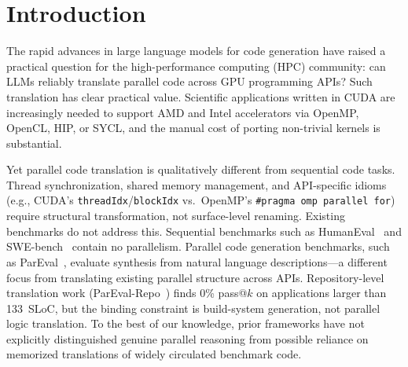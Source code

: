 \documentclass{article}
\begin{document}
\section{Introduction}
\label{sec:introduction}

The rapid advances in large language models for code generation have raised a practical question for the high-performance computing (HPC) community: can LLMs reliably translate parallel code across GPU programming APIs? Such translation has clear practical value. Scientific applications written in CUDA are increasingly needed to support AMD and Intel accelerators via OpenMP, OpenCL, HIP, or SYCL, and the manual cost of porting non-trivial kernels is substantial. 

Yet parallel code translation is qualitatively different from sequential code tasks. Thread synchronization, shared memory management, and API-specific idioms (e.g., CUDA's \texttt{threadIdx}/\texttt{blockIdx} vs.\ OpenMP's \texttt{\#pragma omp parallel for}) require structural transformation, not surface-level renaming. Existing benchmarks do not address this. Sequential benchmarks such as HumanEval~\cite{HumanEval2021} and SWE-bench~\cite{SWEbench2024} contain no parallelism. Parallel code generation benchmarks, such as ParEval~\cite{ParEval2024}, evaluate synthesis from natural language descriptions---a different focus from translating existing parallel structure across APIs. Repository-level translation work (ParEval-Repo~\cite{ParEvalRepo2025}) finds 0\% pass@$k$ on applications larger than 133~SLoC, but the binding constraint is build-system generation, not parallel logic translation. To the best of our knowledge, prior frameworks have not explicitly distinguished genuine parallel reasoning from possible reliance on memorized translations of widely circulated benchmark code.
\end{document}
